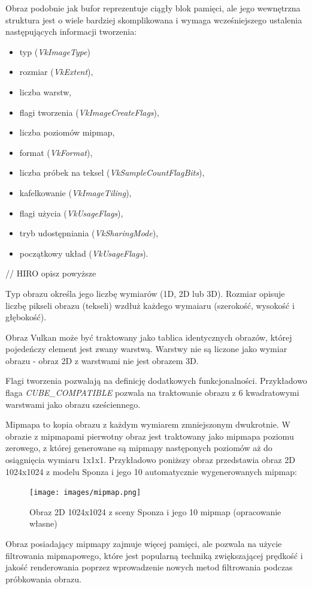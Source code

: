 Obraz podobnie jak bufor reprezentuje ciągły blok pamięci, ale jego wewnętrzna struktura jest o wiele bardziej skomplikowana i wymaga wcześniejszego ustalenia następujących informacji tworzenia:
\begin{itemize}
	\item typ (\textit{VkImageType})
	\item rozmiar (\textit{VkExtent}),
	\item liczba warstw,
	\item flagi tworzenia (\textit{VkImageCreateFlags}),
	\item liczba poziomów mipmap,
	\item format (\textit{VkFormat}),
	\item liczba próbek na teksel (\textit{VkSampleCountFlagBits}),
	\item kafelkowanie (\textit{VkImageTiling}),
	\item flagi użycia (\textit{VkUsageFlags}),
	\item tryb udostępniania (\textit{VkSharingMode}),
	\item początkowy układ (\textit{VkUsageFlags}).
\end{itemize}

// HIRO opisz powyższe

Typ obrazu określa jego liczbę wymiarów (1D, 2D lub 3D).
Rozmiar opisuje liczbę pikseli obrazu (tekseli) wzdłuż każdego wymaiaru (szerokość, wysokość i głębokość).

Obraz Vulkan może być traktowany jako tablica identycznych obrazów, której pojedeńczy element jest zwany warstwą. Warstwy nie są liczone jako wymiar obrazu - obraz 2D z warstwami nie jest obrazem 3D.

Flagi tworzenia pozwalają na definicję dodatkowych funkcjonalności. Przykładowo flaga \textit{CUBE\_COMPATIBLE} pozwala na traktowanie obrazu z 6 kwadratowymi warstwami jako obrazu sześciennego.

Mipmapa to kopia obrazu z każdym wymiarem zmniejszonym dwukrotnie.
W obrazie z mipmapami pierwotny obraz jest traktowany jako mipmapa poziomu zerowego, z której generowane są mipmapy następonych poziomów aż do osiągnięcia wymiaru 1x1x1.
Przykładowo poniższy obraz przedstawia obraz 2D 1024x1024 z modelu Sponza \cite{GLTFSAMPLEMODELS} i jego 10 automatycznie wygenerowanych mipmap:
\begin{figure}[htbp]
	\centering
	\texttt{[image: images/mipmap.png]}
	\caption{Obraz 2D 1024x1024 z sceny Sponza \cite{GLTFSAMPLEMODELS} i jego 10 mipmap (opracowanie własne)}
	\label{mipmap}
\end{figure}
Obraz posiadający mipmapy zajmuje więcej pamięci, ale pozwala na użycie filtrowania mipmapowego, które jest popularną techniką zwiększającej prędkość i jakość renderowania poprzez wprowadzenie nowych metod filtrowania podczas próbkowania obrazu.

